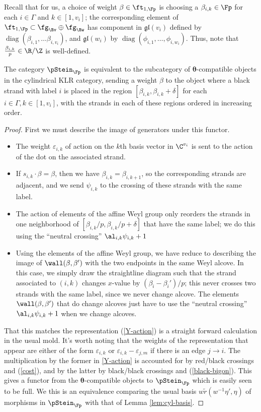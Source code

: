 Recall that for us, a choice of weight $\beta\in \ft_{1,\Fp}$ is choosing a $\beta_{i,k}\in \Fp$ for each $i\in \Gamma$ and $k\in [1,v_i]$; the corresponding element of $\ft_{1,\Fp}\subset \fg_{\Bv}\oplus \fg_{\Bw}$ has component in $\mathfrak{gl}(v_i)$ defined by $\operatorname{diag}(\beta_{i,1},\dots \beta_{i,v_i})$, and $\mathfrak{gl}(w_i)$ by $\operatorname{diag}(\phi_{i,1},\dots, \phi_{i,w_i})$.
Thus, note that $ \frac{\beta_{i,k}}{p}\in \R/\Z$ is well-defined. 
\begin{theorem}\label{thm:KLR-equiv}
The category $\pStein_\Fp$ is equivalent to the subcategory of
$\boldsymbol{\theta}$-compatible objects in the cylindrical KLR category, sending a weight $\beta$ to the object where a black strand with label $i$ is placed in the region $[\beta_{i,k},\beta_{i,k}+\delta]$ for each $i\in \Gamma, k\in [1,v_i]$, with the strands in each of these regions ordered in increasing order.
\end{theorem}
\begin{proof}
First we must describe the image of generators under this functor. \begin{itemize}
\item The weight $\varepsilon_{i,k}$ of action on the $k$th basis vector in $\C^{v_i}$ is sent to the action of the dot on the associated strand.
\item If $s_{i,k}\cdot \beta=\beta$, then we have $\beta_{i,k}=\beta_{i,k+1}$, so the corresponding strands are adjacent, and we send $\psi_{i,k}$ to the crossing of these strands with the same label.
\item The action of elements of the affine Weyl group only reorders the strands in one neighborhood of $[\beta_{i,k}/p,\beta_{i,k}/p+\delta]$ that have the same label; we do this using the ``neutral crossing'' $\al_{i,k}\psi_{i,k}+1$
\item Using the elements of the affine Weyl group, we have reduce to describing the image of $\wall(\beta,\beta')$ with the two endpoints in the same Weyl alcove.  In this case, we simply draw the straightline diagram such that the strand associated to $(i,k)$ changes $x$-value by $(\beta_i-\beta_i')/p$; this never crosses two strands with the same label, since we never change alcove.  The elements $\wall(\beta,\beta')$ that do change alcoves just have to use the ``neutral crossing'' $\al_{i,k}\psi_{i,k}+1$ when we change alcoves. 
\end{itemize} 
That this matches the representation (\ref{Y-action})  is a straight forward calculation in the usual mold.  It's worth noting that the weights of the representation that appear are either of the form $\varepsilon_{i,k}$ or $\varepsilon_{i,k}-\varepsilon_{j,m}$ if there is an edge $j\to i$.  The multiplication by the former in \ref{Y-action} is accounted for by red/black crossings and (\ref{cost}), and by the latter by black/black crossings and (\ref{black-bigon}).  This gives a functor from the $\boldsymbol{\theta}$-compatible objects to  $\pStein_\Fp$ which is easily seen to be full.  We this is an equivalence comparing the usual basis $w\tilde{r}(w^{-1}\eta',\eta)$ of morphisms in $\pStein_\Fp$ with that of Lemma \ref{lem:cyl-basis}.
\end{proof}
